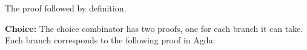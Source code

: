 \documentclass[12pt,a4paper,twoside,openright]{report}
\begin{document}
\begin{code}
\> \AgdaSymbol{:} \AgdaSymbol{(} \AgdaSymbol{:} \AgdaSymbol{)} \<%
\>[19]       \AgdaFunction{[}  \AgdaFunction{]} \<%
\end{code}

The proof followed by definition.

{\bf Choice:} The choice combinator has two proofs, one for each branch it can take. 
Each branch corresponds to the following proof in Agda:
\end{document}
